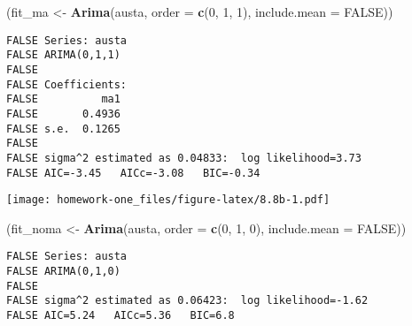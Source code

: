 \documentclass[openany]{book}
\newenvironment{Shaded}{\begin{snugshade}}{\end{snugshade}}
\newcommand{\DataTypeTok}[1]{\textcolor[rgb]{0.13,0.29,0.53}{#1}}
\newcommand{\DecValTok}[1]{\textcolor[rgb]{0.00,0.00,0.81}{#1}}
\newcommand{\KeywordTok}[1]{\textcolor[rgb]{0.13,0.29,0.53}{\textbf{#1}}}
\newcommand{\NormalTok}[1]{#1}
\newcommand{\OperatorTok}[1]{\textcolor[rgb]{0.81,0.36,0.00}{\textbf{#1}}}
\newcommand{\OtherTok}[1]{\textcolor[rgb]{0.56,0.35,0.01}{#1}}
\newcommand{\StringTok}[1]{\textcolor[rgb]{0.31,0.60,0.02}{#1}}
\begin{document}
\begin{Shaded}
\begin{Highlighting}[]
\NormalTok{(fit_ma <-}\StringTok{ }\KeywordTok{Arima}\NormalTok{(austa, }\DataTypeTok{order =} \KeywordTok{c}\NormalTok{(}\DecValTok{0}\NormalTok{, }\DecValTok{1}\NormalTok{, }\DecValTok{1}\NormalTok{), }\DataTypeTok{include.mean =} \OtherTok{FALSE}\NormalTok{))}
\end{Highlighting}
\end{Shaded}

\begin{verbatim}
FALSE Series: austa 
FALSE ARIMA(0,1,1) 
FALSE 
FALSE Coefficients:
FALSE          ma1
FALSE       0.4936
FALSE s.e.  0.1265
FALSE 
FALSE sigma^2 estimated as 0.04833:  log likelihood=3.73
FALSE AIC=-3.45   AICc=-3.08   BIC=-0.34
\end{verbatim}

\begin{Shaded}
\end{Shaded}

\texttt{[image: homework-one\_files/figure-latex/8.8b-1.pdf]}

\begin{Shaded}
\begin{Highlighting}[]
\NormalTok{(fit_noma <-}\StringTok{ }\KeywordTok{Arima}\NormalTok{(austa, }\DataTypeTok{order =} \KeywordTok{c}\NormalTok{(}\DecValTok{0}\NormalTok{, }\DecValTok{1}\NormalTok{, }\DecValTok{0}\NormalTok{), }\DataTypeTok{include.mean =} \OtherTok{FALSE}\NormalTok{))}
\end{Highlighting}
\end{Shaded}

\begin{verbatim}
FALSE Series: austa 
FALSE ARIMA(0,1,0) 
FALSE 
FALSE sigma^2 estimated as 0.06423:  log likelihood=-1.62
FALSE AIC=5.24   AICc=5.36   BIC=6.8
\end{verbatim}

\begin{Shaded}
\end{Shaded}
\end{document}
